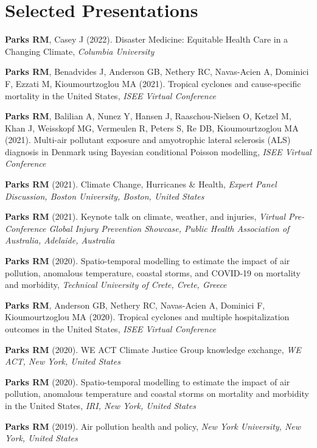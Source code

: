 \section*{Selected Presentations}

\noindent \textbf{Parks RM}, Casey J (2022). Disaster Medicine: Equitable Health Care in a Changing Climate, \textit{Columbia University} \medskip

\noindent \textbf{Parks RM}, Benadvides J, Anderson GB, Nethery RC, Navas-Acien A, Dominici F, Ezzati M, Kioumourtzoglou MA (2021). Tropical cyclones and cause-specific mortality in the United States, \textit{ISEE Virtual Conference} \medskip

\noindent \textbf{Parks RM}, Balilian A, Nunez Y, Hansen J, Raaschou-Nielsen O, Ketzel M, Khan J, Weisskopf MG, Vermeulen R, Peters S, Re DB, Kioumourtzoglou MA (2021). Multi-air pollutant exposure and amyotrophic lateral sclerosis (ALS) diagnosis in Denmark using Bayesian conditional Poisson modelling, \textit{ISEE Virtual Conference} \medskip

\noindent \textbf{Parks RM} (2021). Climate Change, Hurricanes \& Health,  \textit{Expert Panel Discussion, Boston University, Boston, United States} \medskip

\noindent \textbf{Parks RM} (2021). Keynote talk on climate, weather, and injuries,  \textit{Virtual Pre-Conference Global Injury Prevention Showcase, Public Health Association of Australia, Adelaide, Australia} \medskip

\noindent \textbf{Parks RM} (2020). Spatio-temporal modelling to estimate the impact of air pollution, anomalous temperature, coastal storms, and COVID-19 on mortality and morbidity,  \textit{Technical University of Crete, Crete, Greece} \medskip

\noindent \textbf{Parks RM}, Anderson GB, Nethery RC, Navas-Acien A, Dominici F, Kioumourtzoglou MA (2020). Tropical cyclones and multiple hospitalization outcomes in the United States, \textit{ISEE Virtual Conference} \medskip

\noindent \textbf{Parks RM} (2020). WE ACT Climate Justice Group knowledge exchange, \textit{WE ACT, New York, United States} \medskip

\noindent \textbf{Parks RM} (2020). Spatio-temporal modelling to estimate the impact of air pollution, anomalous temperature and coastal storms on mortality and morbidity in the United States,  \textit{IRI, New York, United States} \medskip

\noindent \textbf{Parks RM} (2019). Air pollution health and policy,  \textit{New York University, New York, United States} \medskip


